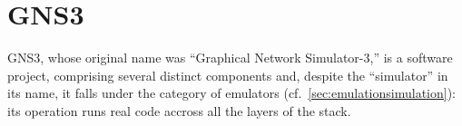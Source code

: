 
\chapter{GNS3}
\label{ch:gns3}

GNS3, whose original name was ``Graphical Network Simulator-3,'' is a software project, comprising several distinct components and, despite the ``simulator'' in its name, it falls under the category of emulators (cf.~\ref{sec:emulationsimulation}): its operation runs real code accross all the layers of the stack. %


